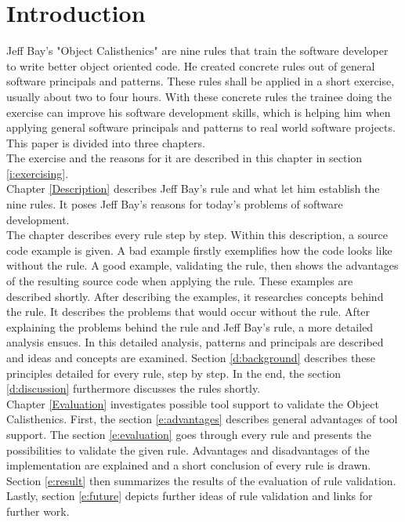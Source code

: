 \chapter{Introduction}
Jeff Bay's "Object Calisthenics" \cite{bay2008} are nine rules that train the software developer to write better object oriented code.  He created concrete rules out of general software principals and patterns. These rules shall be applied in a short exercise, usually about two to four hours. With these concrete rules the trainee doing the exercise can improve his software development skills, which is helping him when applying general software principals and patterns to real world software projects. 
This paper is divided into three chapters.\\
The exercise and the reasons for it are described in this chapter in section \ref{i:exercising}.\\

Chapter \ref{Description} describes Jeff Bay's rule and what let him establish the nine rules. It poses Jeff Bay's reasons for today's problems of software development.\\

The chapter describes every rule step by step. Within this description, a source code example is given. A bad example firstly exemplifies how the code looks like without the rule. A good example, validating the rule, then shows the advantages of the resulting source code when applying the rule. These examples are described shortly. After describing the examples, it researches concepts behind the rule. It describes the problems that would occur without the rule. After explaining the problems behind the rule and Jeff Bay's rule, a more detailed analysis ensues. In this detailed analysis, patterns and principals are described and ideas and concepts are examined. Section \ref{d:background} describes these principles detailed for every rule, step by step. In the end, the section \ref{d:discussion} furthermore discusses the rules shortly.\\

Chapter \ref{Evaluation} investigates possible tool support to validate the Object Calisthenics. First, the section \ref{e:advantages} describes general advantages of tool support. The section \ref{e:evaluation} goes through every rule and presents the possibilities to validate the given rule. Advantages and disadvantages of the implementation are explained and a short conclusion of every rule is drawn. Section \ref{e:result} then summarizes the results of the evaluation of rule validation. Lastly, section \ref{e:future} depicts further ideas of rule validation and links for further work.\\

